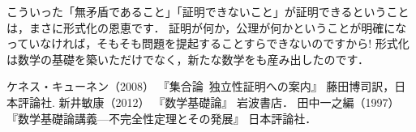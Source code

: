 \documentclass[./main]{subfiles}
\begin{document}
こういった「無矛盾であること」「証明できないこと」が証明できるということは，まさに形式化の恩恵です．
証明が何か，公理が何かということが明確になっていなければ，そもそも問題を提起することすらできないのですから!
形式化は数学の基礎を築いただけでなく，新たな数学をも産み出したのです．

\begin{thebibliography}{9}
 ケネス・キューネン（2008） 『集合論~独立性証明への案内』 藤田博司訳，日本評論社.
 新井敏康（2012） 『数学基礎論』 岩波書店．
 田中一之編（1997） 『数学基礎論講義---不完全性定理とその発展』 日本評論社．
\end{thebibliography}
\end{document}
